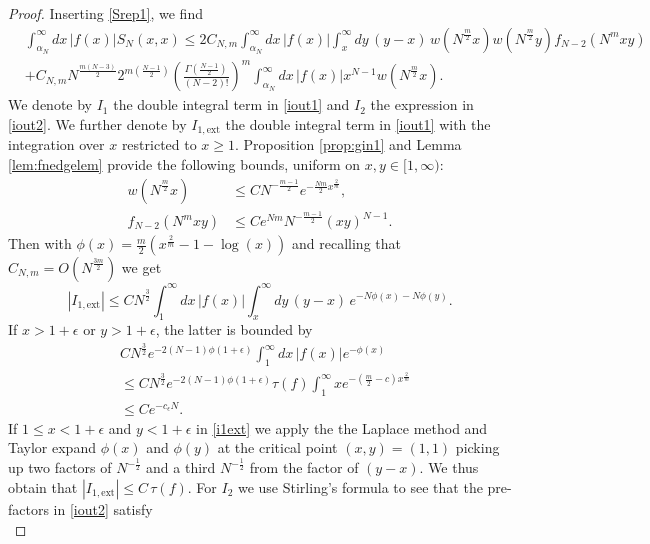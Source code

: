 \documentclass[11pt,reqno]{amsproc}
\numberwithin{equation}{section}
\numberwithin{theorem}{section}
\begin{document}
\begin{proof}
Inserting \eqref{Srep1}, we find \begin{align}
&\int_{\alpha_{N}}^{\infty}dx\,|f(x)|S_{N}(x,x) \leq 2C_{N,m}\int_{\alpha_N}^{\infty}dx\,|f(x)|\int_{x}^{\infty}dy\,(y-x)\,w(N^{\frac{m}{2}}x)w(N^{\frac{m}{2}}y)f_{N-2}(N^{m}xy)\label{iout1}\\
&+C_{N,m}N^{\frac{m(N-3)}{2}}2^{m\left(\frac{N-1}{2}\right)}\left(\frac{\Gamma\left(\frac{N-1}{2}\right)}{(N-2)!}\right)^{m}\int_{\alpha_N}^{\infty}dx\,|f(x)|x^{N-1}w(N^{\frac{m}{2}}x). \label{iout2}
\end{align}
We denote by $I_{1}$ the double integral term in \eqref{iout1} and $I_{2}$ the expression in \eqref{iout2}. We further denote by $I_{1,\mathrm{ext}}$ the double integral term in \eqref{iout1} with the integration over $x$ restricted to $x \geq 1$. Proposition \ref{prop:gin1} and Lemma \ref{lem:fnedgelem} provide the following bounds, uniform on $x, y \in [1,\infty)$:
\begin{align}
w(N^{\frac{m}{2}}x) &\leq CN^{-\frac{m-1}{2}}e^{-\frac{Nm}{2}x^{\frac{2}{m}}}, \label{wbndl1}\\
f_{N-2}(N^{m}xy) & \leq Ce^{Nm}N^{-\frac{m-1}{2}}(xy)^{N-1}. \label{fbndl1}
\end{align}
Then with $\phi(x) = \frac{m}{2}(x^{\frac{2}{m}}-1-\log(x))$ and recalling that $C_{N,m} = O(N^{\frac{3m}{2}})$ we get
\begin{equation}
|I_{1,\mathrm{ext}}| \leq CN^{\frac{3}{2}}\int_{1}^{\infty}dx\,|f(x)|\int_{x}^{\infty}dy\,(y-x)\,e^{-N\phi(x)-N\phi(y)}. \label{i1ext}
\end{equation}
If $x>1+\epsilon$ or $y>1+\epsilon$, the latter is bounded by 
\begin{align}
&CN^{\frac{3}{2}}e^{-2(N-1)\phi(1+\epsilon)}\int_{1}^{\infty}dx\,|f(x)|e^{-\phi(x)} \\
&\leq CN^{\frac{3}{2}}e^{-2(N-1)\phi(1+\epsilon)}\tau(f)\int_{1}^{\infty}xe^{-(\frac{m}{2}-c)x^{\frac{2}{m}}}\\
& \leq Ce^{-c_{\epsilon}N}. \label{firstl1bnd}
\end{align}
If $1 \leq x < 1+\epsilon$ and $y<1+\epsilon$ in \eqref{i1ext} we apply the the Laplace method and Taylor expand $\phi(x)$ and $\phi(y)$ at the critical point $(x,y)=(1,1)$ picking up two factors of $N^{-\frac{1}{2}}$ and a third $N^{-\frac{1}{2}}$ from the factor of $(y-x)$. We thus obtain that $|I_{1,\mathrm{ext}}| \leq C\,\tau(f)$. For $I_{2}$ we use Stirling's formula to see that the pre-factors in \eqref{iout2} satisfy
\begin{equation}

\end{equation}
\end{proof}
\end{document}
